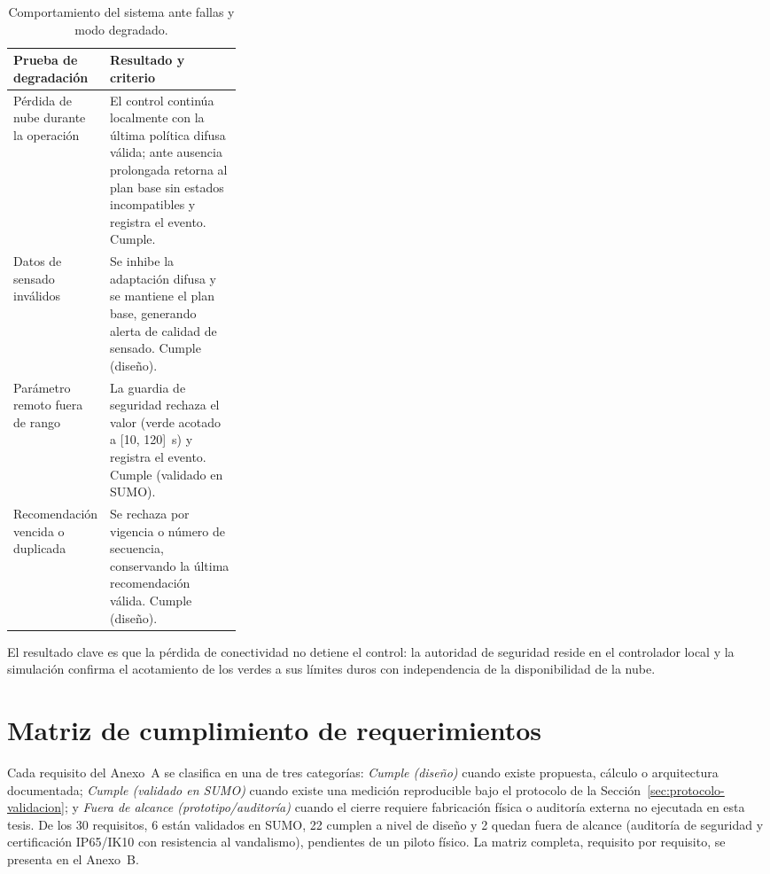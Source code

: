 \begin{table}[H]
  \centering
  \footnotesize
  \caption{Comportamiento del sistema ante fallas y modo degradado.}
  \label{tab:degradacion}
  \begin{tabularx}{\linewidth}{@{}p{0.30\linewidth} X@{}}
    \toprule
    \textbf{Prueba de degradación} & \textbf{Resultado y criterio}\\
    \midrule
    Pérdida de nube durante la operación & El control continúa localmente con la última política difusa válida; ante ausencia prolongada retorna al plan base sin estados incompatibles y registra el evento. Cumple.\\
    Datos de sensado inválidos & Se inhibe la adaptación difusa y se mantiene el plan base, generando alerta de calidad de sensado. Cumple (diseño).\\
    Parámetro remoto fuera de rango & La guardia de seguridad rechaza el valor (verde acotado a [10, 120]~s) y registra el evento. Cumple (validado en SUMO).\\
    Recomendación vencida o duplicada & Se rechaza por vigencia o número de secuencia, conservando la última recomendación válida. Cumple (diseño).\\
    \bottomrule
  \end{tabularx}
\end{table}

El resultado clave es que la pérdida de conectividad no detiene el control: la autoridad de
seguridad reside en el controlador local y la simulación confirma el acotamiento de los verdes
a sus límites duros con independencia de la disponibilidad de la nube.

\section{Matriz de cumplimiento de requerimientos}\label{sec:matriz-cumplimiento}

Cada requisito del Anexo~A se clasifica en una de tres categorías: \emph{Cumple (diseño)} cuando existe
propuesta, cálculo o arquitectura documentada; \emph{Cumple (validado en SUMO)} cuando existe una medición
reproducible bajo el protocolo de la Sección~\ref{sec:protocolo-validacion}; y \emph{Fuera de alcance
(prototipo/auditoría)} cuando el cierre requiere fabricación física o auditoría externa no ejecutada en esta
tesis. De los 30 requisitos, 6 están validados en SUMO, 22 cumplen a nivel de diseño y 2 quedan fuera de
alcance (auditoría de seguridad y certificación IP65/IK10 con resistencia al vandalismo), pendientes de un
piloto físico. La matriz completa, requisito por requisito, se presenta en el Anexo~B.

